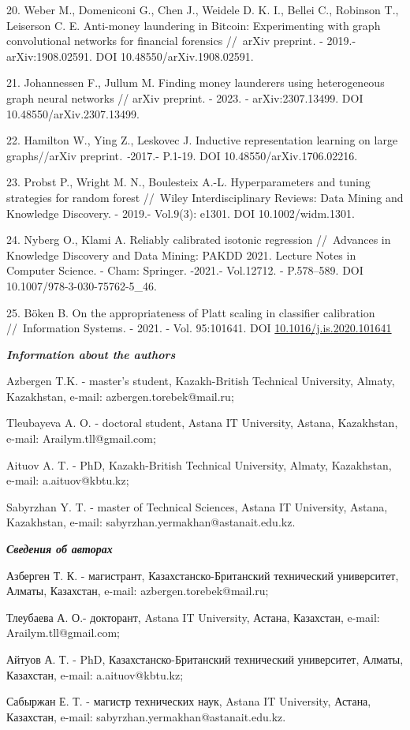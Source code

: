 \begin{refs}
20. Weber M., Domeniconi G., Chen J., Weidele D. K. I., Bellei C.,
Robinson T., Leiserson C. E. Anti-money laundering in Bitcoin:
Experimenting with graph convolutional networks for financial forensics
//~arXiv preprint\emph{.} - 2019.- arXiv:1908.02591. DOI
10.48550/arXiv.1908.02591.

21. Johannessen F., Jullum M. Finding money launderers using
heterogeneous graph neural networks // arXiv preprint. - 2023. -
arXiv:2307.13499. DOI 10.48550/arXiv.2307.13499.

22. Hamilton W., Ying Z., Leskovec J. Inductive representation learning
on large graphs//arXiv preprint\emph{. -}2017.- P.1-19. DOI
10.48550/arXiv.1706.02216.

23. Probst P., Wright M. N., Boulesteix A.-L. Hyperparameters and tuning
strategies for random forest //~Wiley Interdisciplinary Reviews: Data
Mining and Knowledge Discovery. - 2019.- Vol.9(3): e1301. DOI
10.1002/widm.1301.

24. Nyberg O., Klami A. Reliably calibrated isotonic regression
//~Advances in Knowledge Discovery and Data Mining: PAKDD 2021\emph{.}
Lecture Notes in Computer Science. - Cham: Springer. -2021.- Vol.12712.
- P.578--589. DOI 10.1007/978-3-030-75762-5\_46.

25. Böken B. On the appropriateness of Platt scaling in
classifier calibration //~Information Systems\emph{.} - 2021. - Vol.
95:101641. DOI
\href{https://doi.org/10.1016/j.is.2020.101641}{10.1016/j.is.2020.101641}
\end{refs}

\begin{info}
\emph{{\bfseries Information about the authors}}

Azbergen T.K. - master's student, Kazakh-British Technical University,
Almaty, Kazakhstan, e-mail: azbergen.torebek@mail.ru;

Tleubayeva A. O. - doctoral student, Astana IT University, Astana,
Kazakhstan, e-mail: Arailym.tll@gmail.com;

Aituov A. T. - PhD, Kazakh-British Technical University, Almaty,
Kazakhstan, e-mail: a.aituov@kbtu.kz;

Sabyrzhan Y. T. - master of Technical Sciences, Astana IT University,
Astana, Kazakhstan, e-mail: sabyrzhan.yermakhan@astanait.edu.kz.

\emph{{\bfseries Сведения об авторах}}

Азберген Т. К. - магистрант, Казахстанско-Британский технический
университет, Алматы, Казахстан, e-mail: azbergen.torebek@mail.ru;

Тлеубаева А. О.- докторант, Astana IT University, Астана, Казахстан,
e-mail: Arailym.tll@gmail.com;

Айтуов А. Т. - PhD, Казахстанско-Британский технический университет,
Алматы, Казахстан, e-mail: a.aituov@kbtu.kz;

Сабыржан Е. Т. - магистр технических наук, Astana IT University, Астана,
Казахстан, e-mail: sabyrzhan.yermakhan@astanait.edu.kz.
\end{info}
